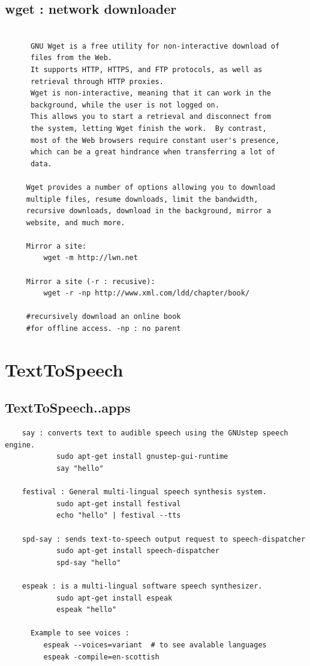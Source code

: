 \documentclass[a4paper,12pt]{article}
\begin{document}
\subsection{wget   : network downloader}
\begin{verbatim}

      GNU Wget is a free utility for non-interactive download of    
      files from the Web.
      It supports HTTP, HTTPS, and FTP protocols, as well as
      retrieval through HTTP proxies.
      Wget is non-interactive, meaning that it can work in the    
      background, while the user is not logged on.
      This allows you to start a retrieval and disconnect from
      the system, letting Wget finish the work.  By contrast,
      most of the Web browsers require constant user's presence,
      which can be a great hindrance when transferring a lot of     
      data.

     Wget provides a number of options allowing you to download 
     multiple files, resume downloads, limit the bandwidth, 
     recursive downloads, download in the background, mirror a 
     website, and much more.

     Mirror a site: 
         wget -m http://lwn.net

     Mirror a site (-r : recusive): 
         wget -r -np http://www.xml.com/ldd/chapter/book/

     #recursively download an online book 
     #for offline access. -np : no parent  
\end{verbatim}







\section{TextToSpeech }

\subsection{TextToSpeech..apps }
\begin{verbatim}
    say : converts text to audible speech using the GNUstep speech engine.
            sudo apt-get install gnustep-gui-runtime
            say "hello"

    festival : General multi-lingual speech synthesis system.
            sudo apt-get install festival
            echo "hello" | festival --tts
            
    spd-say : sends text-to-speech output request to speech-dispatcher
            sudo apt-get install speech-dispatcher
            spd-say "hello"
 
    espeak : is a multi-lingual software speech synthesizer.
            sudo apt-get install espeak
            espeak "hello"
            
      Example to see voices : 
         espeak --voices=variant  # to see avalable languages
         espeak -compile=en-scottish       
            

\end{verbatim}
\end{document}
